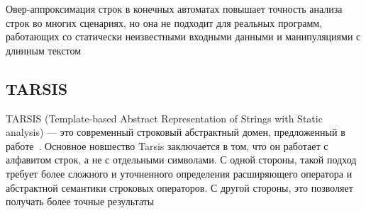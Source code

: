Овер-аппроксимация строк в конечных автоматах повышает точность анализа строк во многих сценариях, но она не подходит для реальных программ, работающих со статически неизвестными входными данными и манипуляциями с длинным текстом




\newpage
\subsection{TARSIS}

TARSIS (Template-based Abstract Representation of Strings with Static analysis) — это современный строковый абстрактный домен, предложенный в работе~\cite{tarsis2021}. Основное новшество Tarsis заключается в том, что он работает с алфавитом строк, а не с отдельными символами. С одной стороны, такой подход требует более сложного и уточненного определения расширяющего оператора и абстрактной семантики строковых операторов. С другой стороны, это позволяет получать более точные результаты
